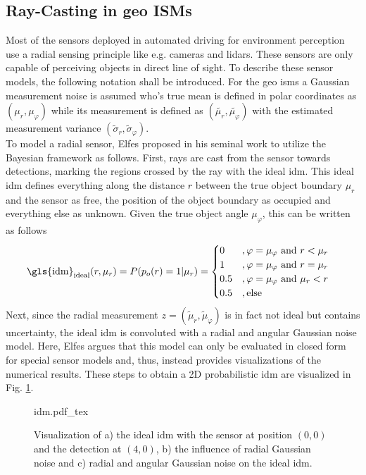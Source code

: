 \subsection{Ray-Casting in geo ISMs}
\label{subsec:ray_casting}
Most of the sensors deployed in automated driving for environment perception use a radial sensing principle like e.g. cameras and lidars. These sensors are only capable of perceiving objects in direct line of sight. To describe these sensor models, the following notation shall be introduced. For the geo \gls{ism}s a Gaussian measurement noise is assumed who's true mean is defined in polar coordinates as $(\mu_r, \mu_\varphi)$ while its measurement is defined as $(\tilde{\mu_r}, \tilde{\mu_\varphi})$ with the estimated measurement variance $(\tilde{\sigma}_r, \tilde{\sigma}_\varphi)$.
\\
To model a radial sensor, Elfes \cite{elfes1989using} proposed in his seminal work to utilize the Bayesian framework as follows. First, rays are cast from the sensor towards detections, marking the regions crossed by the ray with the ideal \gls{idm}. This ideal \gls{idm} defines everything along the distance $r$ between the true object boundary $\mu_r$ and the sensor as free, the position of the object boundary as occupied and everything else as unknown. Given the true object angle $\mu_{\varphi}$,  this can be written as follows 
\begin{align}
	\label{eq:ideal_idm}
	\text{\gls{idm}}_{\text{ideal}}(r,\mu_r) = P(p_o(r) = 1 |\mu_r) &= 
	\begin{cases}
		0 &, \varphi = \mu_{\varphi} \text{ and } r < \mu_r\\
		1 &, \varphi = \mu_{\varphi} \text{ and }r = \mu_r\\
		0.5 &, \varphi = \mu_{\varphi} \text{ and } \mu_r < r\\				
		0.5 &, \text{else}		
	\end{cases}
\end{align}
Next, since the radial measurement $z = (\tilde{\mu}_r, \tilde{\mu}_{\varphi})$ is in fact not ideal but contains uncertainty, the ideal \gls{idm} is convoluted with a radial and angular Gaussian noise model. Here, Elfes argues that this model can only be evaluated in closed form for special sensor models and, thus, instead provides visualizations of the numerical results. These steps to obtain a 2D probabilistic \gls{idm} are visualized in Fig. \ref{fig:idm}.
\begin{figure}
	\begin{center}
		{idm.pdf_tex}
		\caption{\label{fig:idm} Visualization of a) the ideal \gls{idm} with the sensor at position $(0,0)$ and the detection at $(4,0)$, b) the influence of radial Gaussian noise and c) radial and angular Gaussian noise on the ideal \gls{idm}.}
	\end{center}
\end{figure}  
